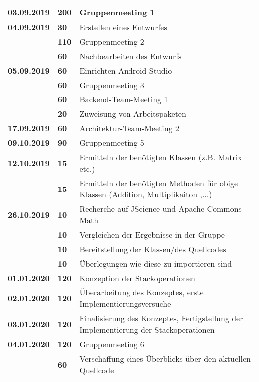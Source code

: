 {{\begin{longtable}{|l|l|p{11cm}|}
		\hline \textbf{03.09.2019} 
		& \textbf{\hfill 200} & Gruppenmeeting 1
		\\ \hline \textbf{04.09.2019}
		& \textbf{\hfill 30} & Erstellen eines Entwurfes \\\cline{2-3}
		& \textbf{\hfill 110} & Gruppenmeeting 2 \\\cline{2-3}
		& \textbf{\hfill 60} & Nachbearbeiten des Entwurfs
		\\ \hline \textbf{05.09.2019}
		& \textbf{\hfill 60} & Einrichten Android Studio \\\cline{2-3}
		& \textbf{\hfill 60} & Gruppenmeeting 3 \\\cline{2-3}
		& \textbf{\hfill 60} & Backend-Team-Meeting 1 \\\cline{2-3}
		& \textbf{\hfill 20} & Zuweisung von Arbeitspaketen 
		\\ \hline \textbf{17.09.2019}
		& \textbf{\hfill 60} & Architektur-Team-Meeting 2
		\\ \hline \textbf{09.10.2019}
		& \textbf{\hfill 90} & Gruppenmeeting 5
		\\ \hline \textbf{12.10.2019}
		& \textbf{\hfill 15} & Ermitteln der benötigten Klassen (z.B. Matrix etc.) \\\cline{2-3}
		& \textbf{\hfill 15} & Ermitteln der benötigten Methoden für obige Klassen (Addition, Multiplikaiton ,...)		
		\\ \hline \textbf{26.10.2019}
		& \textbf{\hfill 10} & Recherche auf JScience und Apache Commons Math \\\cline{2-3}
		& \textbf{\hfill 10} & Vergleichen der Ergebnisse in der Gruppe \\\cline{2-3}
		& \textbf{\hfill 10} & Bereitstellung der Klassen/des Quellcodes \\\cline{2-3}
		& \textbf{\hfill 10} & Überlegungen wie diese zu importieren sind
		\\ \hline \textbf{01.01.2020}
		& \textbf{\hfill 120} & Konzeption der Stackoperationen
		\\ \hline \textbf{02.01.2020}
		& \textbf{\hfill 120} & Überarbeitung des Konzeptes, erste Implementierungsversuche
		\\ \hline \textbf{03.01.2020}
		& \textbf{\hfill 120} & Finalisierung des Konzeptes, Fertigstellung der Implementierung der Stackoperationen 
		\\ \hline \textbf{04.01.2020}
		& \textbf{\hfill 120} & Gruppenmeeting 6 \\\cline{2-3}
		& \textbf{\hfill 60} & Verschaffung eines Überblicks über den aktuellen Quellcode \\\cline{2-3}

\end{longtable}}}
